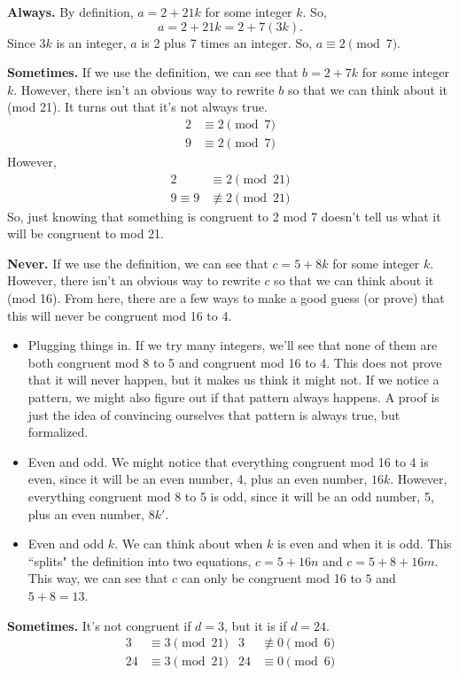 \documentclass[12pt]{exam}
\begin{document}
\begin{solution}
\begin{qparts}
    \item \textbf{Always.} By definition, $a = 2 + 21k$ for some integer $k$. So,
    \[ a = 2 + 21k = 2 + 7(3k). \]
    Since $3k$ is an integer, $a$ is 2 plus 7 times an integer. So, $a \equiv 2 \pmod{7}$.
    \item \textbf{Sometimes.} If we use the definition, we can see that $b = 2 + 7k$ for some integer $k$. However, there isn't an obvious way to rewrite $b$ so that we can think about it (mod 21). It turns out that it's not always true.
    \begin{align*}
        2 &\equiv 2 \pmod{7}\\
        9 &\equiv 2 \pmod{7}
    \end{align*}
    However,
    \begin{align*}
        2 &\equiv 2 \pmod{21}\\
        9 \equiv 9 &\not\equiv 2 \pmod{21}
    \end{align*}
    So, just knowing that something is congruent to 2 mod 7 doesn't tell us what it will be congruent to mod 21.
    \item \textbf{Never.} If we use the definition, we can see that $c=5+8k$ for some integer $k$. However, there isn't an obvious way to rewrite $c$ so that we can think about it (mod 16). From here, there are a few ways to make a good guess (or prove) that this will never be congruent mod 16 to 4.
    \begin{itemize}
        \item Plugging things in. If we try many integers, we'll see that none of them are both congruent mod 8 to 5 and congruent mod 16 to 4. This does not prove that it will never happen, but it makes us think it might not. If we notice a pattern, we might also figure out if that pattern always happens. A proof is just the idea of convincing ourselves that pattern is always true, but formalized.
        \item Even and odd. We might notice that everything congruent mod 16 to 4 is even, since it will be an even number, 4, plus an even number, $16k$. However, everything congruent mod 8 to 5 is odd, since it will be an odd number, 5, plus an even number, $8k'$.
        \item Even and odd $k$. We can think about when $k$ is even and when it is odd. This ``splits" the definition into two equations, $c=5+16n$ and $c=5+8+16m$. This way, we can see that $c$ can only be congruent mod 16 to $5$ and $5+8=13$.
    \end{itemize}
    \item \textbf{Sometimes.} It's not congruent if $d = 3$, but it is if $d = 24$.
    \begin{align*}
        3 &\equiv 3 \pmod{21} & 3 &\not\equiv 0 \pmod{6}\\
        24 &\equiv 3 \pmod{21} & 24 &\equiv 0 \pmod{6}
    \end{align*}
\end{qparts}


\end{solution}
\end{document}
